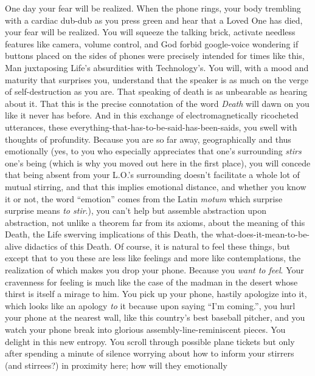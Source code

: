 \documentclass{article}
\begin{document}
\newline

One day your fear will be realized. When the phone rings, your body
trembling with a cardiac dub-dub as you press green and hear that
a Loved One has died, your fear will be realized. You will squeeze the
talking brick, activate needless features like camera, volume control,
and God forbid google-voice wondering if buttons placed on the sides of
phones were precisely intended for times like this, Man juxtaposing
Life's absurdities with Technology's. You will, with a mood and maturity
that surprises you, understand that the speaker is as much on the verge
of self-destruction as you are. That speaking of death is as unbearable
as hearing about it. That this is the precise connotation of the word
\textit{Death} will dawn on you like it never has before. And in this
exchange of electromagnetically ricocheted utterances, these
everything-that-has-to-be-said-has-been-saids, you swell with thoughts
of profundity. Because you are so far away, geographically and thus
emotionally (yes, to you who especially appreciates that one's
surrounding \textit{stirs} one's being (which is why you moved out here
in the first place), you will concede that being absent from your L.O.'s
surrounding doesn't facilitate a whole lot of mutual stirring, and that
this implies emotional distance, and whether you know it or not, the
word ``emotion'' comes from the Latin \textit{motum} which surprise
surprise means \textit{to stir}.), you can't help but assemble
abstraction upon abstraction, not unlike a theorem far from its axioms,
about the meaning of this Death, the Life swerving implications of this
Death, the what-does-it-mean-to-be-alive didactics of this Death. Of
course, it is natural to feel these things, but except that to you these
are less like feelings and more like contemplations, the realization of
which makes you drop your phone. Because you \textit{want to feel}. Your
cravenness for feeling is much like the case of the madman in the desert
whose thirst is itself a mirage to him. You pick up your phone, hastily
apologize into it, which looks like an apology \textit{to} it because
upon saying ``I'm coming.'', you hurl your phone at the nearest wall,
like this country's best baseball pitcher, and you watch your phone
break into glorious assembly-line-reminiscent pieces. You delight in
this new entropy. You scroll through possible plane tickets but only
after spending a minute of silence worrying about how to inform your
stirrers (and stirrees?) in proximity here; how will they emotionally
\end{document}
